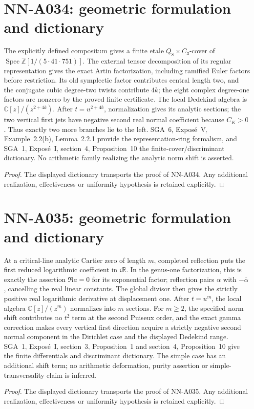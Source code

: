 \section{NN-A034: geometric formulation and dictionary}
\begin{geometricstatement}[NN-A034]
The explicitly defined compositum gives a finite etale $Q_8\times C_3$-cover of $\operatorname{Spec}\mathbb Z[1/(5\cdot41\cdot751)]$. The external tensor decomposition of its regular representation gives the exact Artin factorization, including ramified Euler factors before restriction. Its old symplectic factor contributes central length two, and the conjugate cubic degree-two twists contribute $4k$; the eight complex degree-one factors are nonzero by the proved finite certificate. The local Dedekind algebra is $\mathbb C[z]/(z^{2+4k})$. After $t=u^{2+4k}$, normalization gives its analytic sections; the two vertical first jets have negative second real normal coefficient because $C_K>0$. Thus exactly two more branches lie to the left. SGA~6, Expos\'e~V, Example~2.2(b), Lemma~2.2.1 provide the representation-ring formalism, and SGA~1, Expos\'e~I, section~4, Proposition~10 the finite-cover/discriminant dictionary. No arithmetic family realizing the analytic norm shift is asserted.
\end{geometricstatement}
\begin{proof} The displayed dictionary transports the proof of NN-A034. Any additional realization, effectiveness or uniformity hypothesis is retained explicitly.\end{proof}


\section{NN-A035: geometric formulation and dictionary}
\begin{geometricstatement}[NN-A035]
At a critical-line analytic Cartier zero of length $m$, completed reflection puts the first reduced logarithmic coefficient in $i\mathbb R$. In the genus-one factorization, this is exactly the assertion $\Re a=0$ for its exponential factor; reflection pairs $\alpha$ with $-\bar\alpha$, cancelling the real linear constants. The global divisor then gives the strictly positive real logarithmic derivative at displacement one. After $t=u^m$, the local algebra $\mathbb C[z]/(z^m)$ normalizes into $m$ sections. For $m\ge2$, the specified norm shift contributes no $t^2$ term at the second Puiseux order, and the exact gamma correction makes every vertical first direction acquire a strictly negative second normal component in the Dirichlet case and the displayed Dedekind range. SGA~1, Expos\'e~I, section~3, Proposition~1 and section~4, Proposition~10 give the finite differentials and discriminant dictionary. The simple case has an additional shift term; no arithmetic deformation, purity assertion or simple-transversality claim is inferred.
\end{geometricstatement}
\begin{proof} The displayed dictionary transports the proof of NN-A035. Any additional realization, effectiveness or uniformity hypothesis is retained explicitly.\end{proof}



